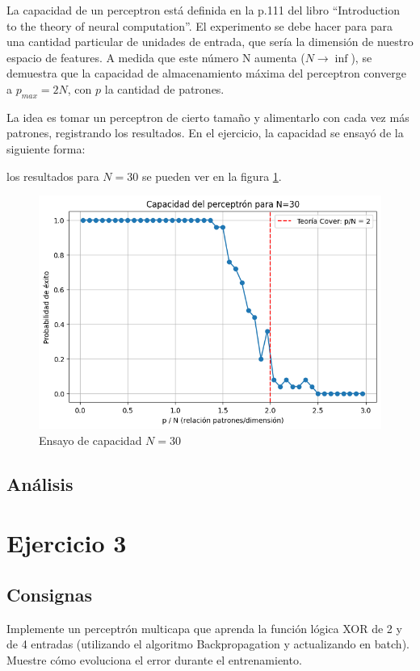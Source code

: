\documentclass[11pt]{article} %
\begin{document}
La capacidad de un perceptron está definida en la p.111 del libro ``Introduction to the theory of neural computation''. El experimento se debe hacer para para una cantidad particular de unidades de entrada, que sería la dimensión de nuestro espacio de features. A medida que este número N aumenta ($N \to \inf$), se demuestra que la capacidad de almacenamiento máxima del perceptron converge a $p_{max} = 2N$, con $p$ la cantidad de patrones.

La idea es tomar un perceptron de cierto tamaño y alimentarlo con cada vez más patrones, registrando los resultados.
En el ejercicio, la capacidad se ensayó de la siguiente forma:

los resultados para $N=30$ se pueden ver en la figura \ref{fig:capacidad}.

\begin{figure}[h!]
	\centering
	\includegraphics[width=0.7\linewidth]{../imgs/ej2/capacidad}
	\caption[]{Ensayo de capacidad $N=30$}
	\label{fig:capacidad}
\end{figure}


\subsection{Análisis}

\clearpage

\section{Ejercicio 3}

\subsection{Consignas}

Implemente un perceptrón multicapa que aprenda la función lógica XOR de 2 y de 4 entradas (utilizando el algoritmo Backpropagation y actualizando en batch). Muestre cómo evoluciona el error durante el entrenamiento.
\end{document}
